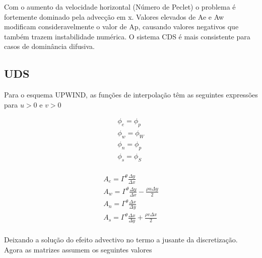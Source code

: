 \documentclass[]{article}
\begin{document}
	
Com o aumento da velocidade horizontal (Número de Peclet) o problema é fortemente dominado pela advecção em x. Valores elevados de Ae e Aw modificam consideravelmente o valor de Ap, causando valores negativos que também trazem instabilidade numérica. O sistema CDS é mais consistente para casos de dominância difusiva.
	
\subsection*{UDS}

Para o esquema UPWIND, as funções de interpolação têm as seguintes expressões para $u > 0$ e $ v > 0$

\begin{equation}
	\begin{aligned}
		\phi_e = \phi_p\\
		\phi_w = \phi_W\\
		\phi_n = \phi_p\\
		\phi_s = \phi_S
	\end{aligned}	
\end{equation}\\

\begin{equation}
	\begin{aligned}
		A_e = \varGamma^{\theta}\frac{\Delta y}{\Delta x} \\
		A_w = \varGamma^{\theta}\frac{\Delta y}{\Delta x} - \frac{\rho u \Delta y}{2}\\
		A_n = \varGamma^{\theta}\frac{\Delta x}{\Delta y}\\
		A_s = \varGamma^{\theta}\frac{\Delta x}{\Delta y} + \frac{\rho v \Delta x}{2}
	\end{aligned}
\end{equation}\\

Deixando a solução do efeito advectivo no termo a jusante da discretização. Agora as matrizes assumem os seguintes valores
\end{document}
